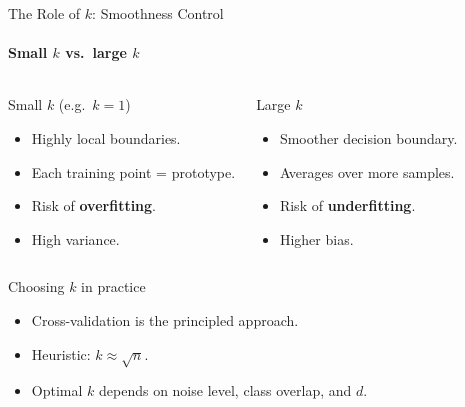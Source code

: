 \begin{frame}{The Role of $k$: Smoothness Control}
  \framesubtitle{Small $k$ vs.\ large $k$}
  \begin{columns}[T]
      \begin{alertblock}{Small $k$ (e.g.\ $k=1$)}
        \begin{itemize}
          \item Highly local boundaries.
          \item Each training point = prototype.
          \item Risk of \textbf{overfitting}.
          \item High variance.
        \end{itemize}
      \end{alertblock}
      \begin{block}{Large $k$}
        \begin{itemize}
          \item Smoother decision boundary.
          \item Averages over more samples.
          \item Risk of \textbf{underfitting}.
          \item Higher bias.
        \end{itemize}
      \end{block}
  \end{columns}
  \bigskip
  \begin{block}{Choosing $k$ in practice}
    \begin{itemize}
      \item Cross-validation is the principled approach.
      \item Heuristic: $k \approx \sqrt{n}$.
      \item Optimal $k$ depends on noise level, class overlap, and $d$.
    \end{itemize}
  \end{block}
\end{frame}


